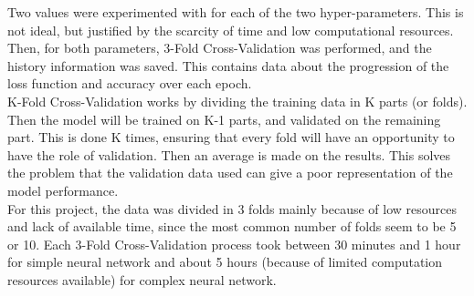 Two values were experimented with for each of the two hyper-parameters. This is not ideal, but justified by the scarcity of time and low computational resources. Then, for both parameters, 3-Fold Cross-Validation was performed, and the history information was saved. This contains data about the progression of the loss function and accuracy over each epoch.\\

K-Fold Cross-Validation works by dividing the training data in K parts (or folds). Then the model will be trained on K-1 parts, and validated on the remaining part. This is done K times, ensuring that every fold will have an opportunity to have the role of validation. Then an average is made on the results. This solves the problem that the validation data used can give a poor representation of the model performance.\\
For this project, the data was divided in 3 folds mainly because of low resources and lack of available time, since the most common number of folds seem to be 5 or 10. Each 3-Fold Cross-Validation process took between 30 minutes and 1 hour
for simple neural network and about 5 hours (because of limited computation resources available) for complex neural network.\\
